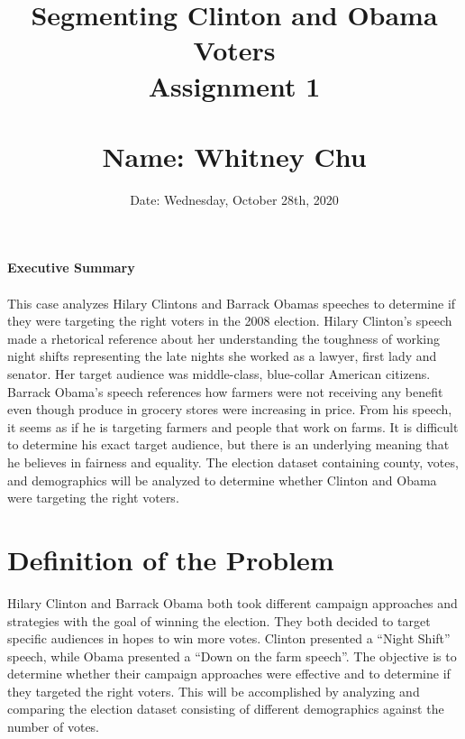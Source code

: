 \documentclass[11pt]{article}
\title{Segmenting Clinton and Obama Voters\\ \vspace{1.0cm}
Assignment 1 \\
\\ \vspace{1.0cm}
Name: Whitney Chu\\
}
\date{Date: Wednesday, October 28th, 2020}
\begin{document}
\begin{titlepage}
    \centering
    \maketitle
    \thispagestyle{empty}
\end{titlepage}

\pagebreak

\newpage
\thispagestyle{empty}
\textbf{Executive Summary}
\\\\
This case analyzes Hilary Clintons and Barrack Obamas speeches to determine if they were targeting the right voters in the 2008 election. Hilary Clinton’s speech made a rhetorical reference about her understanding the toughness of working night shifts representing the late nights she worked as a lawyer, first lady and senator. Her target audience was middle-class, blue-collar American citizens. Barrack Obama’s speech references how farmers were not receiving any benefit even though produce in grocery stores were increasing in price. From his speech, it seems as if he is targeting farmers and people that work on farms. It is difficult to determine his exact target audience, but there is an underlying meaning that he believes in fairness and equality. The election dataset containing county, votes, and demographics will be analyzed to determine whether Clinton and Obama were targeting the right voters.



\newpage
\thispagestyle{empty}
\tableofcontents
\newpage


\newpage
{}
\doublespacing



\section{Definition of the Problem}
Hilary Clinton and Barrack Obama both took different campaign approaches and strategies with the goal of winning the election. They both decided to target specific audiences in hopes to win more votes. Clinton presented a “Night Shift” speech, while Obama presented a “Down on the farm speech”. The objective is to determine whether their campaign approaches were effective and to determine if they targeted the right voters. This will be accomplished by analyzing and comparing the election dataset consisting of different demographics against the number of votes.  \\
\end{document}
